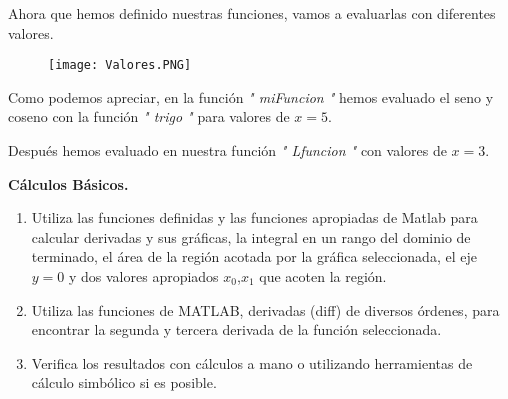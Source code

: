 \documentclass[letterpaper]{article}
\begin{document}
\vspace{\baselineskip}

\begin{justify}
    Ahora que hemos definido nuestras funciones, vamos a evaluarlas con diferentes valores.
\end{justify}
\begin{figure}[H]
    \centering
    \texttt{[image: Valores.PNG]}        
\end{figure}
\begin{justify}
    Como podemos apreciar, en la función \textit{" miFuncion "} hemos evaluado el seno y coseno con la función \textit{ " trigo "} para valores de \(x=5\).
\end{justify}
\begin{justify}
   Después hemos evaluado en nuestra función \textit{" Lfuncion "} con valores de \(x = 3\).
\end{justify}

\vspace{\baselineskip}

\textbf{Cálculos Básicos.}
\begin{enumerate}
    \item Utiliza las funciones definidas y las funciones apropiadas de Matlab para
    calcular derivadas y sus gráficas, la integral en un rango del dominio de
    terminado, el área de la región acotada por la gráfica seleccionada, el eje \(y=0\)
    y dos valores apropiados \(x_0\),\(x_1\) que acoten la región.

    \item Utiliza las funciones de MATLAB, derivadas (diff) de diversos órdenes,
    para encontrar la segunda y tercera derivada de la función seleccionada.

    \item Verifica los resultados con cálculos a mano o utilizando herramientas de
    cálculo simbólico si es posible.
\end{enumerate}

\vspace{\baselineskip}
\end{document}
